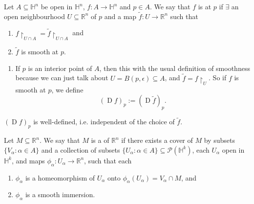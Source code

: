 \documentclass[notoc,notitlepage]{tufte-book}
\DeclareMathOperator{\D}{D}
\begin{document}
\begin{defn}\label{defn:smooth_functions_in_the_half_space}
  Let $A \subseteq \mathbb{H}^n$ be open in $\mathbb{H}^n$, $f : A \to
  \mathbb{H}^n$ and $p \in A$. We say that $f$ is  at $p$ if
  $\exists$ an open neighbourhood $U \subseteq \mathbb{R}^n$ of $p$ and a map
  $\tilde{f} : U \to \mathbb{R}^n$ such that
  \begin{enumerate}
    \item $f \restriction_{U \cap A} = \tilde{f} \restriction_{U \cap A}$ and
    \item $\tilde{f}$ is smooth at $p$.
  \end{enumerate}
\end{defn}

\begin{remark}
  \begin{enumerate}
    \item If $p$ is an interior point of $A$, then this  with
      the usual definition of smoothness because we can just talk about $U =
      B(p, \epsilon) \subseteq A$, and $\tilde{f} = f \restriction_{U}$. So if
      $f$ is smooth at $p$, we define
      \begin{equation*}
        (\D f)_p := (\D \tilde{f})_p.
      \end{equation*}
  \end{enumerate}
\end{remark}

\noindent
{} $(\D f)_p$ is well-defined, i.e. independent of the choice of
$\tilde{f}$.

\begin{defn}\label{defn:submanifold_with_boundary}
  Let $M \subseteq \mathbb{R}^n$. We say that $M$ is a  of $\mathbb{R}^n$ if there exists a cover of $M$ by
  subsets $\{ V_\alpha : \alpha \in A \}$ and a collection of subsets $\{
  U_\alpha : \alpha \in A \} \subseteq \mathcal{P}(\mathbb{H}^k)$, each
  $U_\alpha$ open in $\mathbb{H}^k$, and maps $\phi_\alpha : U_\alpha \to
  \mathbb{R}^n$, such that each
  \begin{enumerate}
    \item $\phi_\alpha$ is a homeomorphism of $U_\alpha$ onto
      $\phi_\alpha(U_\alpha) = V_\alpha \cap M$, and
    \item $\phi_\alpha$ is a smooth immersion.
  \end{enumerate}
\end{defn}
\end{document}

